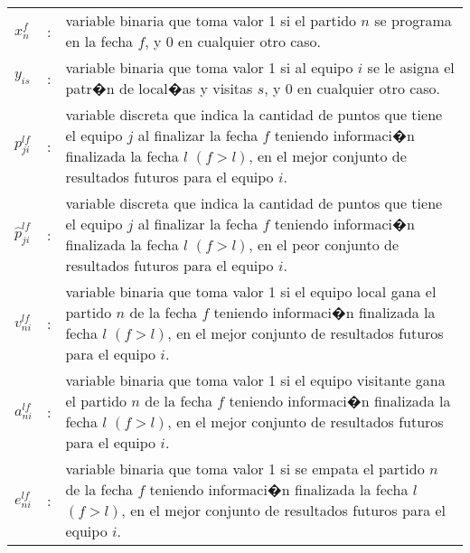 \documentclass[authoryear,preprint,review,12pt]{elsarticle}
\begin{document}
\begin{tabular}{p{0.79cm}cp{13.5cm}}
$x_{n}^f$   & : & variable binaria que toma valor 1 si el partido $n$ se programa en la fecha $f$, y 0 en cualquier otro caso.\\
$y_{is}$    & : & variable binaria que toma valor 1 si al equipo $i$ se le asigna el patr�n de local�as y visitas $s$, y 0 en cualquier otro caso.\\
$p_{ji}^{lf}$  & : & variable discreta que indica la cantidad de puntos que tiene el equipo $j$ al finalizar la fecha $f$ teniendo informaci�n finalizada la fecha $l$ $(f > l)$, en el mejor conjunto de resultados futuros para el equipo $i$.\\
$\hat{p}_{ji}^{lf}$  & : & variable discreta que indica la cantidad de puntos que tiene el equipo $j$ al finalizar la fecha $f$ teniendo informaci�n finalizada la fecha $l$ $(f > l)$, en el peor conjunto de resultados futuros para el equipo $i$.\\
$v_{ni}^{lf}$  & : & variable binaria que toma valor 1 si el equipo local gana el partido $n$ de la fecha $f$ teniendo informaci�n finalizada la fecha $l$ $(f > l)$, en el mejor conjunto de resultados futuros para el equipo $i$.\\
$a_{ni}^{lf}$  & : & variable binaria que toma valor 1 si el equipo visitante gana el partido $n$ de la fecha $f$ teniendo informaci�n finalizada la fecha $l$ $(f > l)$, en el mejor conjunto de resultados futuros para el equipo $i$.\\
$e_{ni}^{lf}$  & : & variable binaria que toma valor 1 si se empata el partido $n$ de la fecha $f$ teniendo informaci�n finalizada la fecha $l$ $(f > l)$, en el mejor conjunto de resultados futuros para el equipo $i$.\\
\end{tabular}
\end{document}
